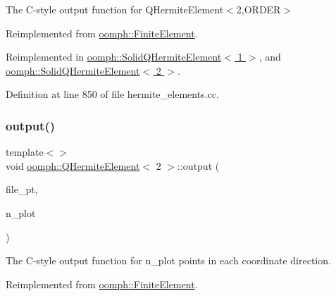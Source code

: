 The C-\/style output function for Q\+Hermite\+Element$<$2,\+O\+R\+D\+E\+R$>$ 



Reimplemented from \hyperlink{classoomph_1_1FiniteElement_a72cddd09f8ddbee1a20a1ff404c6943e}{oomph\+::\+Finite\+Element}.



Reimplemented in \hyperlink{classoomph_1_1SolidQHermiteElement_ae4f251ca932301e92e1b897cec6f0459}{oomph\+::\+Solid\+Q\+Hermite\+Element$<$ 1 $>$}, and \hyperlink{classoomph_1_1SolidQHermiteElement_ae4f251ca932301e92e1b897cec6f0459}{oomph\+::\+Solid\+Q\+Hermite\+Element$<$ 2 $>$}.



Definition at line 850 of file hermite\+\_\+elements.\+cc.

\mbox{\label{classoomph_1_1QHermiteElement_a901e801649625708086312f1cba77147}} 
\subsubsection{\texorpdfstring{output()}{output()}\hspace{0.1cm}{\footnotesize\ttfamily [12/12]}}
{\footnotesize\ttfamily template$<$$>$ \\
void \hyperlink{classoomph_1_1QHermiteElement}{oomph\+::\+Q\+Hermite\+Element}$<$ 2 $>$\+::output (\begin{DoxyParamCaption}\item[{F\+I\+LE $\ast$}]{file\+\_\+pt,  }\item[{const unsigned \&}]{n\+\_\+plot }\end{DoxyParamCaption})\hspace{0.3cm}{\ttfamily [virtual]}}



The C-\/style output function for n\+\_\+plot points in each coordinate direction. 



Reimplemented from \hyperlink{classoomph_1_1FiniteElement_adfaee690bb0608f03320eeb9d110d48c}{oomph\+::\+Finite\+Element}.



